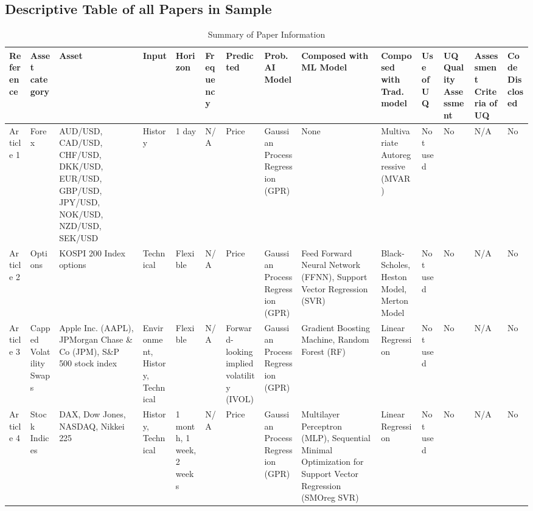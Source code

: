 \subsection{Descriptive Table of all Papers in Sample}
\label{appendix:descriptive_table_of_all_articles}

\begin{sidewaystable} %
    \centering
    \caption[Descriptive table of all papers in sample]{Summary of Paper Information}
    \label{table:paper_info_summary}
    \scriptsize %
    \begin{adjustbox}{width=1\textheight, center} %
    \begin{tabular}{p{} p{} p{} p{} p{} p{} p{} p{} p{} p{} p{} p{} p{} p{}}
        \toprule
        \textbf{Reference} & \textbf{Asset category} & \textbf{Asset} & \textbf{Input} & \textbf{Horizon} & \textbf{Frequency} & \textbf{Predicted} & \textbf{Prob. AI Model} & \textbf{Composed with ML Model} & \textbf{Composed with Trad. model} & \textbf{Use of UQ} & \textbf{UQ Quality Assessment} & \textbf{Assessment Criteria of UQ} & \textbf{Code Disclosed} \\
        \midrule
        Article 1 & Forex & AUD/USD, CAD/USD, CHF/USD, DKK/USD, EUR/USD, GBP/USD, JPY/USD, NOK/USD, NZD/USD, SEK/USD & History & 1 day & N/A & Price & Gaussian Process Regression (GPR) & None & Multivariate Autoregressive (MVAR) & Not used & No & N/A & No \\

        Article 2 & Options & KOSPI 200 Index options & Technical & Flexible & N/A & Price & Gaussian Process Regression (GPR) & Feed Forward Neural Network (FFNN), Support Vector Regression (SVR) & Black-Scholes, Heston Model, Merton Model & Not used & No & N/A & No \\

        Article 3 & Capped Volatility Swaps & Apple Inc. (AAPL), JPMorgan Chase \& Co (JPM), S\&P 500 stock index & Environment, History, Technical & Flexible & N/A & Forward-looking implied volatility (IVOL) & Gaussian Process Regression (GPR) & Gradient Boosting Machine, Random Forest (RF) & Linear Regression & Not used & No & N/A & No \\
        
        Article 4 & Stock Indices & DAX, Dow Jones, NASDAQ, Nikkei 225 & History, Technical & 1 month, 1 week, 2 weeks & N/A & Price & Gaussian Process Regression (GPR) & Multilayer Perceptron (MLP), Sequential Minimal Optimization for Support Vector Regression (SMOreg SVR) & Linear Regression & Not used & No & N/A & No \\
        

\end{tabular}
\end{adjustbox}
\end{sidewaystable}
